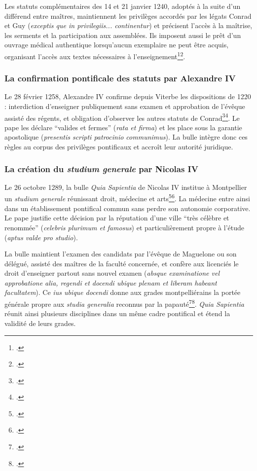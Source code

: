 Les statuts complémentaires des 14 et 21 janvier 1240, adoptés à la suite d'un différend entre maîtres, maintiennent les privilèges accordés par les légats Conrad et Guy (\emph{exceptis que in privilegiis... continentur}) et précisent l'accès à la maîtrise, les serments et la participation aux assemblées. Ils imposent aussi le prêt d'un ouvrage médical authentique lorsqu'aucun exemplaire ne peut être acquis, organisant l'accès aux textes nécessaires à l'enseignement\footcite{AHFMB1}\footcite{Statuts1240}.

\subsubsection{La confirmation pontificale des statuts par Alexandre IV}

Le 28 février 1258, Alexandre IV confirme depuis Viterbe les dispositions de 1220 : interdiction d'enseigner publiquement sans examen et approbation de l'évêque assisté des régents, et obligation d'observer les autres statuts de Conrad\footcite{AHFMB2}\footcite{AlexandreIV1258}. Le pape les déclare \enquote{valides et fermes} (\emph{rata et firma}) et les place sous la garantie apostolique (\emph{presentis scripti patrocinio communimus}). La bulle intègre donc ces règles au corpus des privilèges pontificaux et accroît leur autorité juridique.

\subsubsection{La création du \emph{studium generale} par Nicolas IV}

Le 26 octobre 1289, la bulle \emph{Quia Sapientia} de Nicolas IV institue à Montpellier un \emph{studium generale} réunissant droit, médecine et arts\footcite{MontpellierAMLouvet619}\footcite{NicolasIV1289}. La médecine entre ainsi dans un établissement pontifical commun sans perdre son autonomie corporative. Le pape justifie cette décision par la réputation d'une ville \enquote{très célèbre et renommée} (\emph{celebris plurimum et famosus}) et particulièrement propre à l'étude (\emph{aptus valde pro studio}).

La bulle maintient l'examen des candidats par l'évêque de Maguelone ou son délégué, assisté des maîtres de la faculté concernée, et confère aux licenciés le droit d'enseigner partout sans nouvel examen (\emph{absque examinatione vel approbatione alia, regendi et docendi ubique plenam et liberam habeant facultatem}). Ce \emph{ius ubique docendi} donne aux grades montpelliérains la portée générale propre aux \emph{studia generalia} reconnus par la papauté\footcite{Verger2021}\footcite{Moulinier2003Montpellier}. \emph{Quia Sapientia} réunit ainsi plusieurs disciplines dans un même cadre pontifical et étend la validité de leurs grades.

